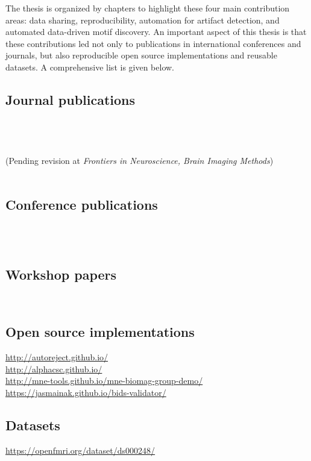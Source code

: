 The thesis is organized by chapters to highlight these four main  contribution areas: data sharing, reproducibility, automation for artifact detection, and automated data-driven motif discovery. An important aspect of this thesis is that these contributions led not only to publications in international conferences and journals, but also reproducible open source implementations and reusable datasets. A comprehensive list is given below.

\subsection*{Journal publications}
\ \\ \\
\ \\ (Pending revision at \emph{Frontiers in Neuroscience, Brain Imaging Methods})\ \\ \\

\subsection*{Conference publications}
\ \\ \\

\subsection*{Workshop papers}
\

\subsection*{Open source implementations}

\url{http://autoreject.github.io/} \\
\url{http://alphacsc.github.io/} \\
\url{http://mne-tools.github.io/mne-biomag-group-demo/}\\
\url{https://jasmainak.github.io/bids-validator/}

\subsection*{Datasets}

\url{https://openfmri.org/dataset/ds000248/}


